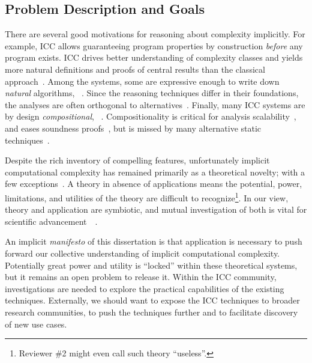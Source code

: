 \subsection{Problem Description and Goals}

There are several good motivations for reasoning about complexity implicitly.
For example, ICC allows guaranteeing program properties by construction \emph{before} any program exists.
ICC drives better understanding of complexity classes and yields more natural definitions and proofs of central results than the classical approach~\cite{kristiansen2017}.
Among the systems, some are expressive enough to write down \emph{natural} algorithms, \eg~\cite{jones2009,marion2011}.
Since the reasoning techniques differ in their foundations, the analyses are often orthogonal to alternatives~\cite{aubert20222}.
Finally, many ICC systems are by design \emph{compositional}, \eg~\cite{jones2009,marion2011,hainry2023,atkey2024}.
Compositionality is critical for analysis scalability~\cite{carbonneaux2015}, and eases soundness proofs~\cite{keidel2021}, but is missed by many alternative static techniques~\cite{carbonneaux2015,schiebel2024}.

Despite the rich inventory of compelling features, unfortunately implicit computational complexity has remained primarily as a theoretical novelty;
with a few exceptions~\cite{avanzini2017,avanzini2008,moyen20172,hoffmann2012,hainry2021,feree2018}.
A theory in absence of applications means the potential, power, limitations, and utilities of the theory are difficult to recognize\footnote{
Reviewer \#2 might even call such theory \enquote{useless}.}.
In our view, theory and application are symbiotic, and mutual investigation of both is vital for scientific advancement~\cite[pg. xxxv]{bishop2003}~\cite[p. 75]{moyen2017}.

An implicit \emph{manifesto} of this dissertation is that application is necessary to push forward our collective understanding of implicit computational complexity.
Potentially great power and utility is \enquote{locked} within these theoretical systems, but it remains an open problem to release it.
Within the ICC community, investigations are needed to explore the practical capabilities of the existing techniques.
Externally, we should want to expose the ICC techniques to broader research communities, to push the techniques further and to facilitate discovery of new use cases.

